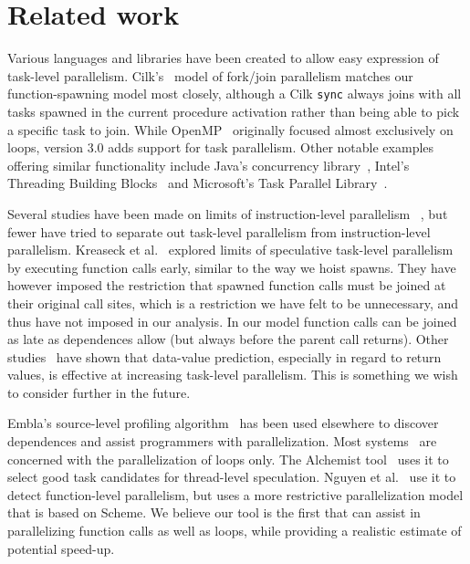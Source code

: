 \section{Related work}

Various languages and libraries have been created to allow easy
expression of task-level parallelism.  Cilk's~\cite{blumofe96cilk}
model of fork/join parallelism matches our function-spawning model
most closely, although a Cilk {\tt sync} always joins with all tasks 
spawned in the current procedure activation rather than being able to 
pick a specific task to join. While OpenMP~\cite{dagum98openmp} 
originally focused almost exclusively on loops, version 3.0 adds 
support for task parallelism.  Other notable examples
offering similar functionality 
include Java's concurrency library~\cite{lea00java}, Intel's
Threading Building Blocks~\cite{reinders07intel} and Microsoft's
Task Parallel Library~\cite{leijen07parallel}.

Several studies have been made on limits of instruction-level parallelism~
\cite{wall91limits,postiff99limits},
but fewer have tried to separate out task-level
parallelism from instruction-level parallelism.  Kreaseck et al.\
 explored limits of speculative task-level
parallelism by executing function calls early, similar to the
way we hoist spawns.  They have however imposed the restriction that
spawned function calls must be joined at their original call sites,
which is a restriction we have felt to be unnecessary, and thus have
not imposed in our analysis.  In our model function calls can be
joined as late as dependences allow (but always before the parent
call returns).  Other studies~\cite{warg01limits,oplinger99insearch}
have shown that data-value prediction, especially in regard to return
values, is effective at increasing task-level parallelism.  This is
something we wish to consider further in the future.

Embla's source-level profiling algorithm~\cite{embla:08} has been used 
elsewhere to discover dependences and assist programmers with parallelization.
Most systems~\cite{wu08compiler,tournavitis09towards,larus93loop}
are concerned with the parallelization of loops only.
The Alchemist tool~\cite{zhang09alchemist} uses it
to select good task candidates for thread-level speculation.
Nguyen et al.~\cite{nguyen02parallelizing} use it to detect function-level parallelism,
but uses a more restrictive parallelization model that is based on Scheme.
We believe our tool is the first that can assist in parallelizing function calls as well as loops,
while providing a realistic estimate of potential speed-up.

